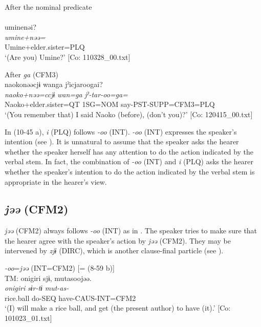   \ex After the nominal predicate\\\\
      \glll    uminenəi?\\
    \textit{umine+nəə=}\\
    Umine+elder.sister=PLQ\\
\glt     ‘(Are you) Umine?’  [Co: 110328\_00.txt]

  \ex After \textit{ga} (CFM3)\\
      \glll    naokonəəcjɨ  wanga  jˀicjaroogai?\\
    \textit{naoko+nəə=ccjɨ}  \textit{wan=ga}  \textit{jˀ-tar-oo=ga=}\\
    Naoko+elder.sister=QT  1SG=NOM  say-PST-SUPP=CFM3=PLQ\\
  \glt     ‘(You remember that) I said Naoko (before), (don’t you)?’  [Co: 120415\_00.txt]
  \z
\z

In (10-45 a), \textit{i} (PLQ) follows \textit{{}-oo} (INT). \textit{{}-oo} (INT) expresses the speaker’s intention (see ). It is unnatural to assume that the speaker asks the hearer whether the speaker herself has any attention to do the action indicated by the verbal stem. In fact, the combination of \textit{{}-oo} (INT) and \textit{i} (PLQ) asks the hearer whether the speaker’s intention to do the action indicated by the verbal stem is appropriate in the hearer’s view.

\subsection{\textit{jəə} (CFM2)}\label{sec:10.3.4}

\textit{jəə} (CFM2) always follows \textit{-oo} (INT) as in . The speaker tries to make sure that the hearer agree with the speaker’s action by \textit{jəə} (CFM2). They may be intervened by \textit{zjɨ} (DIRC), which is another clause-final particle (see ).

\ea\label{ex:10.46}   \textit{{}-oo}=\textit{jəə} (INT=CFM2) [= (8-59 b)]\\
  \ea TM:
      \glll    {\textbar}onigiri{\textbar}  sjɨ,  mutasoojəə.\\
      \textit{onigiri}  \textit{sɨr-tɨ}  \textit{mut-as-}\\
      rice.ball  do-SEQ  have-CAUS-INT=CFM2\\
      \glt       ‘(I) will make a rice ball, and get (the present author) to have (it).’ [Co: 101023\_01.txt]

